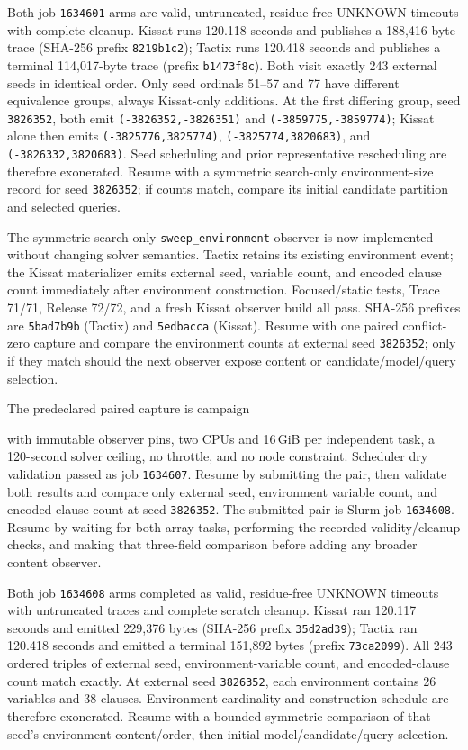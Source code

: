 \documentclass[11pt]{article}
\newcommand{\code}[1]{\texttt{#1}}
\newcommand{\artifact}[1]{\path{#1}}
\begin{document}
Both job \code{1634601} arms are valid, untruncated, residue-free UNKNOWN
timeouts with complete cleanup. Kissat runs 120.118 seconds and publishes a
188,416-byte trace (SHA-256 prefix \code{8219b1c2}); Tactix runs 120.418
seconds and publishes a terminal 114,017-byte trace (prefix \code{b1473f8c}).
Both visit exactly 243 external seeds in identical order. Only seed ordinals
51--57 and 77 have different equivalence groups, always Kissat-only additions.
At the first differing group, seed \code{3826352}, both emit
\code{(-3826352,-3826351)} and \code{(-3859775,-3859774)}; Kissat alone then
emits \code{(-3825776,3825774)}, \code{(-3825774,3820683)}, and
\code{(-3826332,3820683)}. Seed scheduling and prior representative
rescheduling are therefore exonerated. Resume with a symmetric search-only
environment-size record for seed \code{3826352}; if counts match, compare its
initial candidate partition and selected queries.

The symmetric search-only \code{sweep\_environment} observer is now implemented
without changing solver semantics. Tactix retains its existing environment
event; the Kissat materializer emits external seed, variable count, and encoded
clause count immediately after environment construction. Focused/static tests,
Trace 71/71, Release 72/72, and a fresh Kissat observer build all pass. SHA-256
prefixes are \code{5bad7b9b} (Tactix) and \code{5edbacca} (Kissat). Resume with
one paired conflict-zero capture and compare the environment counts at external
seed \code{3826352}; only if they match should the next observer expose content
or candidate/model/query selection.

The predeclared paired capture is campaign
\begin{center}\small\artifact{20260819-1133-tierd-rank22-sweep-environments}\end{center}
with immutable observer pins, two CPUs and 16\,GiB per independent task, a
120-second solver ceiling, no throttle, and no node constraint. Scheduler dry
validation passed as job \code{1634607}. Resume by submitting the pair, then
validate both results and compare only external seed, environment variable
count, and encoded-clause count at seed \code{3826352}.
The submitted pair is Slurm job \code{1634608}. Resume by waiting for both
array tasks, performing the recorded validity/cleanup checks, and making that
three-field comparison before adding any broader content observer.

Both job \code{1634608} arms completed as valid, residue-free UNKNOWN timeouts
with untruncated traces and complete scratch cleanup. Kissat ran 120.117 seconds
and emitted 229,376 bytes (SHA-256 prefix \code{35d2ad39}); Tactix ran 120.418
seconds and emitted a terminal 151,892 bytes (prefix \code{73ca2099}). All 243
ordered triples of external seed, environment-variable count, and encoded-clause
count match exactly. At external seed \code{3826352}, each environment contains
26 variables and 38 clauses. Environment cardinality and construction schedule
are therefore exonerated. Resume with a bounded symmetric comparison of that
seed's environment content/order, then initial model/candidate/query selection.
\end{document}
